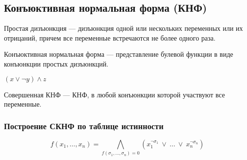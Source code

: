 \subsection{Конъюктивная нормальная форма (КНФ)}

\begin{defn}
    Простая дизъюнкция --- дизъюнкция  одной или нескольких переменных или их отрицаний, причем все переменные встречаются не более одного раза.
\end{defn}

\begin{defn}
    Конъюктивная нормальная форма --- представление булевой функции в виде конъюнкции простых дизъюнкций. 
\end{defn}

\begin{example}
    $(x \vee \neg y) \wedge z$
\end{example}

\begin{defn}
    Совершенная КНФ --- КНФ, в любой конъюнкции которой участвуют все переменные.
\end{defn}

\subsubsection*{Построение СКНФ по таблице истинности}

\[f(x_1, \ldots, x_n) = \bigwedge_{f(\sigma_1, \ldots, \sigma_n) = 0}
(x_1^{\neg \sigma_1}\ \vee\  \ldots\ \vee\ x_n^{\neg \sigma_n})\]    